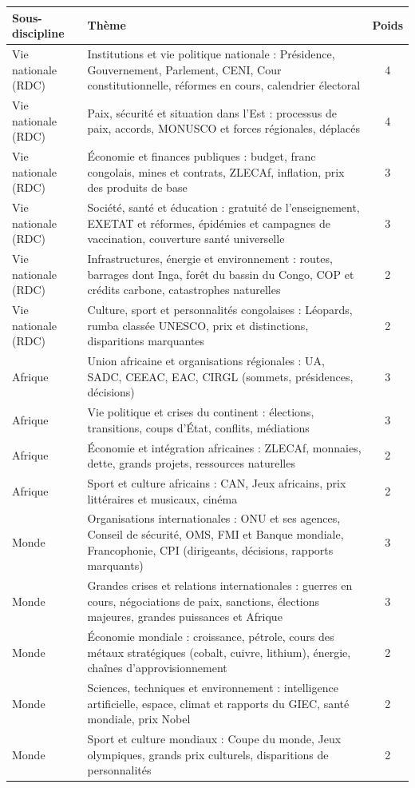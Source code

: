 \documentclass[11pt,a4paper]{article}
\begin{document}
\begin{longtable}{@{}>{\raggedright\arraybackslash}p{3cm}>{\raggedright\arraybackslash}p{11.6cm}c@{}}
\toprule
\textbf{Sous-discipline} & \textbf{Thème} & \textbf{Poids}\\
\midrule\endhead
Vie nationale (RDC) & Institutions et vie politique nationale : Présidence, Gouvernement, Parlement, CENI, Cour constitutionnelle, réformes en cours, calendrier électoral & 4\\
Vie nationale (RDC) & Paix, sécurité et situation dans l'Est : processus de paix, accords, MONUSCO et forces régionales, déplacés & 4\\
Vie nationale (RDC) & Économie et finances publiques : budget, franc congolais, mines et contrats, ZLECAf, inflation, prix des produits de base & 3\\
Vie nationale (RDC) & Société, santé et éducation : gratuité de l'enseignement, EXETAT et réformes, épidémies et campagnes de vaccination, couverture santé universelle & 3\\
Vie nationale (RDC) & Infrastructures, énergie et environnement : routes, barrages dont Inga, forêt du bassin du Congo, COP et crédits carbone, catastrophes naturelles & 2\\
Vie nationale (RDC) & Culture, sport et personnalités congolaises : Léopards, rumba classée UNESCO, prix et distinctions, disparitions marquantes & 2\\
Afrique & Union africaine et organisations régionales : UA, SADC, CEEAC, EAC, CIRGL (sommets, présidences, décisions) & 3\\
Afrique & Vie politique et crises du continent : élections, transitions, coups d'État, conflits, médiations & 3\\
Afrique & Économie et intégration africaines : ZLECAf, monnaies, dette, grands projets, ressources naturelles & 2\\
Afrique & Sport et culture africains : CAN, Jeux africains, prix littéraires et musicaux, cinéma & 2\\
Monde & Organisations internationales : ONU et ses agences, Conseil de sécurité, OMS, FMI et Banque mondiale, Francophonie, CPI (dirigeants, décisions, rapports marquants) & 3\\
Monde & Grandes crises et relations internationales : guerres en cours, négociations de paix, sanctions, élections majeures, grandes puissances et Afrique & 3\\
Monde & Économie mondiale : croissance, pétrole, cours des métaux stratégiques (cobalt, cuivre, lithium), énergie, chaînes d'approvisionnement & 2\\
Monde & Sciences, techniques et environnement : intelligence artificielle, espace, climat et rapports du GIEC, santé mondiale, prix Nobel & 2\\
Monde & Sport et culture mondiaux : Coupe du monde, Jeux olympiques, grands prix culturels, disparitions de personnalités & 2\\
\bottomrule
\end{longtable}
\end{document}
